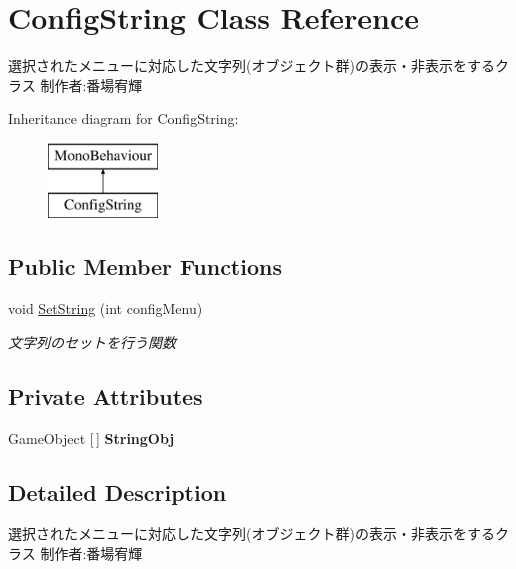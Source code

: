\hypertarget{class_config_string}{}\section{Config\+String Class Reference}
\label{class_config_string}


選択されたメニューに対応した文字列(オブジェクト群)の表示・非表示をするクラス 制作者\+:番場宥輝  


Inheritance diagram for Config\+String\+:\begin{figure}[H]
\begin{center}
\leavevmode
\includegraphics[height=2.000000cm]{class_config_string}
\end{center}
\end{figure}
\subsection*{Public Member Functions}
\begin{DoxyCompactItemize}
\item 
void \hyperlink{class_config_string_a9457ae28b527dca04d011021e459120c}{Set\+String} (int config\+Menu)
\begin{DoxyCompactList}\small\item\em 文字列のセットを行う関数 \end{DoxyCompactList}\end{DoxyCompactItemize}
\subsection*{Private Attributes}
\begin{DoxyCompactItemize}
\item 
\mbox{\label{class_config_string_abceef91734f86497ab1d1caa79428a1d}} 
Game\+Object \mbox{[}$\,$\mbox{]} {\bfseries String\+Obj}
\end{DoxyCompactItemize}


\subsection{Detailed Description}
選択されたメニューに対応した文字列(オブジェクト群)の表示・非表示をするクラス 制作者\+:番場宥輝 




